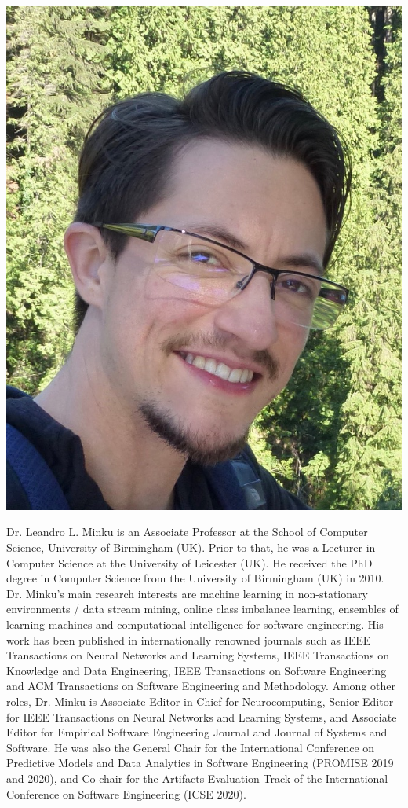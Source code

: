 \abouteditors

\begin{center}
\includegraphics[width=.3\textwidth]{Photos/minku.jpg}
\end{center}

Dr. Leandro L. Minku is an Associate Professor at the School of Computer Science, University of Birmingham (UK). Prior to that, he was a Lecturer in Computer Science at the University of Leicester (UK). He received the PhD degree in Computer Science from the University of Birmingham (UK) in 2010. Dr. Minku's main research interests are machine learning in non-stationary environments / data stream mining, online class imbalance learning, ensembles of learning machines and computational intelligence for software engineering. His work has been published in internationally renowned journals such as IEEE Transactions on Neural Networks and Learning Systems, IEEE Transactions on Knowledge and Data Engineering, IEEE Transactions on Software Engineering and ACM Transactions on Software Engineering and Methodology. Among other roles, Dr. Minku is Associate Editor-in-Chief for Neurocomputing, Senior Editor for IEEE Transactions on Neural Networks and Learning Systems, and Associate Editor for Empirical Software Engineering Journal and Journal of Systems and Software. He was also the General Chair for the International Conference on Predictive Models and Data Analytics in Software Engineering (PROMISE 2019 and 2020), and Co-chair for the Artifacts Evaluation Track of the International Conference on Software Engineering (ICSE 2020).

